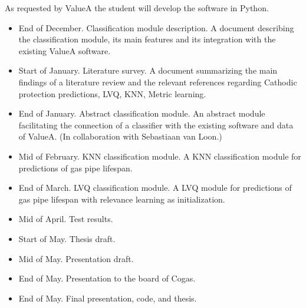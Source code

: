 As requested by ValueA the student will develop the software in Python.
\begin{itemize}
\item End of December. Classification module description. A document describing the classification module, its main features and its integration with the existing ValueA software.
\item Start of January. Literature survey. A document summarizing the main findings of a literature review and the relevant references regarding Cathodic protection predictions, LVQ, KNN, Metric learning.
\item End of January. Abstract classification module. An abstract module facilitating the connection of a classifier with the existing software and data of ValueA. (In collaboration with Sebastiaan van Loon.)
\item Mid of February. KNN classification module. A KNN classification module for predictions of gas pipe lifespan.
\item End of March. LVQ classification module. A LVQ module for predictions of gas pipe lifespan with relevance learning as initialization.
\item Mid of April. Test results.
\item Start of May. Thesis draft.
\item Mid of May. Presentation draft.
\item End of May. Presentation to the board of Cogas.
\item End of May. Final presentation, code, and thesis.
\end{itemize}
